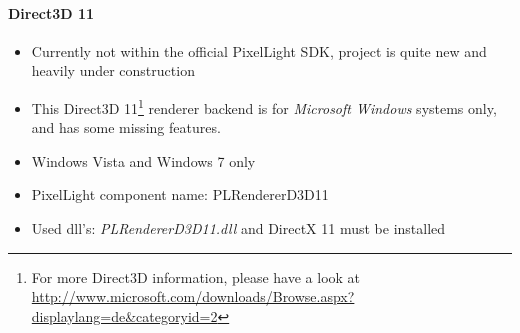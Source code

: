 \paragraph{Direct3D 11}
\begin{itemize}
\item Currently not within the official PixelLight SDK, project is quite new and heavily under construction
\item This Direct3D 11\footnote{For more Direct3D information, please have a look at \url{http://www.microsoft.com/downloads/Browse.aspx?displaylang=de&categoryid=2}} renderer backend is for \emph{Microsoft Windows} systems only, and has some missing features.
\item Windows Vista and Windows 7 only
\item PixelLight component name: PLRendererD3D11
\item Used dll's: \emph{PLRendererD3D11.dll} and DirectX 11 must be installed
\end{itemize}

